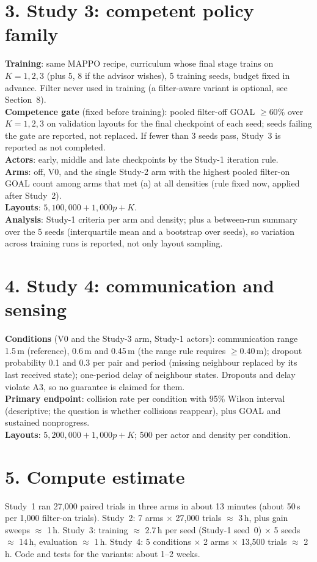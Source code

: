 \documentclass[10pt]{article}
\begin{document}
\section*{3. Study 3: competent policy family}
\textbf{Training}: same MAPPO recipe, curriculum whose final stage trains on $K=1,2,3$ (plus 5, 8 if the advisor wishes), 5 training seeds, budget fixed in advance. Filter never used in training (a filter-aware variant is optional, see Section~8).\\
\textbf{Competence gate} (fixed before training): pooled filter-off GOAL $\ge60\%$ over $K=1,2,3$ on validation layouts for the final checkpoint of each seed; seeds failing the gate are reported, not replaced. If fewer than 3 seeds pass, Study~3 is reported as not completed.\\
\textbf{Actors}: early, middle and late checkpoints by the Study-1 iteration rule.\\
\textbf{Arms}: off, V0, and the single Study-2 arm with the highest pooled filter-on GOAL count among arms that met (a) at all densities (rule fixed now, applied after Study~2).\\
\textbf{Layouts}: $5{,}100{,}000+1{,}000p+K$.\\
\textbf{Analysis}: Study-1 criteria per arm and density; plus a between-run summary over the 5 seeds (interquartile mean and a bootstrap over seeds), so variation across training runs is reported, not only layout sampling.

\section*{4. Study 4: communication and sensing}
\textbf{Conditions} (V0 and the Study-3 arm, Study-1 actors): communication range 1.5\,m (reference), 0.6\,m and 0.45\,m (the range rule requires $\ge0.40$\,m); dropout probability 0.1 and 0.3 per pair and period (missing neighbour replaced by its last received state); one-period delay of neighbour states. Dropouts and delay violate A3, so no guarantee is claimed for them.\\
\textbf{Primary endpoint}: collision rate per condition with 95\% Wilson interval (descriptive; the question is whether collisions reappear), plus GOAL and sustained nonprogress.\\
\textbf{Layouts}: $5{,}200{,}000+1{,}000p+K$; 500 per actor and density per condition.

\section*{5. Compute estimate}
Study~1 ran 27{,}000 paired trials in three arms in about 13 minutes (about 50\,s per 1{,}000 filter-on trials). Study~2: 7 arms $\times$ 27{,}000 trials $\approx$ 3\,h, plus gain sweeps $\approx$ 1\,h. Study~3: training $\approx$ 2.7\,h per seed (Study-1 seed~0) $\times$ 5 seeds $\approx$ 14\,h, evaluation $\approx$ 1\,h. Study~4: 5 conditions $\times$ 2 arms $\times$ 13{,}500 trials $\approx$ 2\,h. Code and tests for the variants: about 1--2 weeks.
\end{document}
